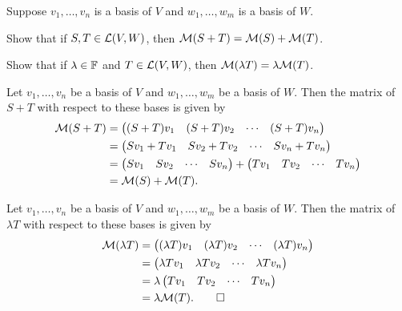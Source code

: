 \begin{exercise}
Suppose $v_1,\dots,v_n$ is a basis of $V$ and $w_1,\dots,w_m$ is a basis of
$W$.
\begin{parts}
\item Show that if $S,T\in\mathcal{L}(V,W)$, then $\mathcal{M}(S+T)=\mathcal{M}(S)+\mathcal{M}(T)$.
\item Show that if $\lambda\in\mathbb{F}$ and $T\in\mathcal{L}(V,W)$, then
  $\mathcal{M}(\lambda T)=\lambda\mathcal{M}(T)$.
\end{parts}
\end{exercise}
\begin{solution}\leavevmode
\begin{parts}
\item Let $v_1,\dots,v_n$ be a basis of $V$ and $w_1,\dots,w_m$ be a basis of
  $W$. Then the matrix of $S+T$ with respect to these bases is given by
  \begin{align*}
  \mathcal{M}(S+T) &= \begin{pmatrix} (S+T)v_1 & (S+T)v_2 & \cdots & (S+T)v_n
               \end{pmatrix}\\
   &= \begin{pmatrix} Sv_1+Tv_1 & Sv_2+Tv_2 & \cdots & Sv_n+Tv_n
      \end{pmatrix}\\
   &= \begin{pmatrix} Sv_1 & Sv_2 & \cdots & Sv_n \end{pmatrix}
      + \begin{pmatrix} Tv_1 & Tv_2 & \cdots & Tv_n \end{pmatrix}\\
   &= \mathcal{M}(S)+\mathcal{M}(T).
  \end{align*}
\item Let $v_1,\dots,v_n$ be a basis of $V$ and $w_1,\dots,w_m$ be a basis of
  $W$. Then the matrix of $\lambda T$ with respect to these bases is given by
  \begin{align*}
  \mathcal{M}(\lambda T) &= \begin{pmatrix} (\lambda T)v_1 & (\lambda T)v_2 & \cdots
                     & (\lambda T)v_n \end{pmatrix}\\
   &= \begin{pmatrix} \lambda Tv_1 & \lambda Tv_2 & \cdots & \lambda Tv_n
      \end{pmatrix}\\
   &= \lambda\begin{pmatrix} Tv_1 & Tv_2 & \cdots & Tv_n \end{pmatrix}\\
   &= \lambda\mathcal{M}(T). \qedhere
  \end{align*}
\end{parts}
\end{solution}

